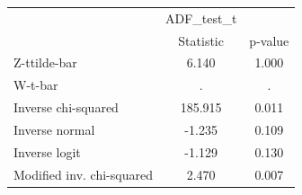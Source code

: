 \begin{tabular}{l*{2}{c}}
\hline\hline
            &  ADF\_test\_t&            \\
            &   Statistic&     p-value\\
\hline
Z-ttilde-bar&       6.140&       1.000\\
W-t-bar     &           .&           .\\
Inverse chi-squared&     185.915&       0.011\\
Inverse normal&      -1.235&       0.109\\
Inverse logit&      -1.129&       0.130\\
Modified inv. chi-squared&       2.470&       0.007\\
\hline\hline
\end{tabular}
